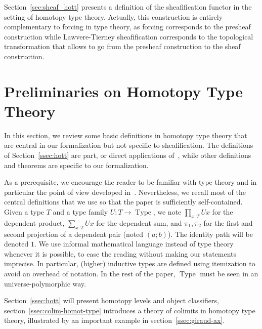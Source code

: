 \documentclass[notfinal]{jfrarticle}
\DeclareMathOperator{\Type}{Type}
\begin{document}
Section~\ref{sec:sheaf_hott} presents a definition of the
sheafification functor in the setting of homotopy type
theory. Actually, this construction is entirely complementary to
forcing in type theory, as forcing corresponds to the presheaf
construction while Lawvere-Tierney sheafification corresponds to the
topological transformation that allows to go from the presheaf
construction to the sheaf construction.


\section{Preliminaries on Homotopy Type Theory}
\label{sec:hott}

In this section, we review some basic definitions in homotopy type
theory that are central in our formalization but not specific to
sheafification. 
The definitions of Section~\ref{ssec:hott} 
are part, or direct applications of~\cite{hottbook}, while other definitions
and theorems are specific to our formalization. 

As a prerequisite, we encourage the reader to be familiar with type theory and
in particular the point of view developed
in~\cite{hottbook}. Nevertheless, we recall most of the central definitions 
that we use so that the paper is sufficiently self-contained.
%
Given a type $T$ and a type family $U : T \to \Type$, we note
$\prod_{x:T} U x$ for the dependent product, $\sum_{x:T} U x$ for the dependent
sum, and $\pi_1, \pi_2$ for the first and second projection of a
dependent pair (noted $(a;b)$). The identity path will be denoted
$1$. We use informal mathematical language
instead of type theory whenever it is possible, to ease the reading
without making our statements imprecise. In particular, (higher)
inductive types are defined using itemization to avoid an overhead of
notation. In the rest of the paper, $\Type$ must be seen in an
universe-polymorphic way.

Section~\ref{ssec:hott} will present homotopy levels and object
classifiers, section~\ref{ssec:colim-homot-type} introduces a theory
of colimits in homotopy type theory, illustrated by an important
example in section~\ref{ssec:giraud-ax}.
\end{document}
